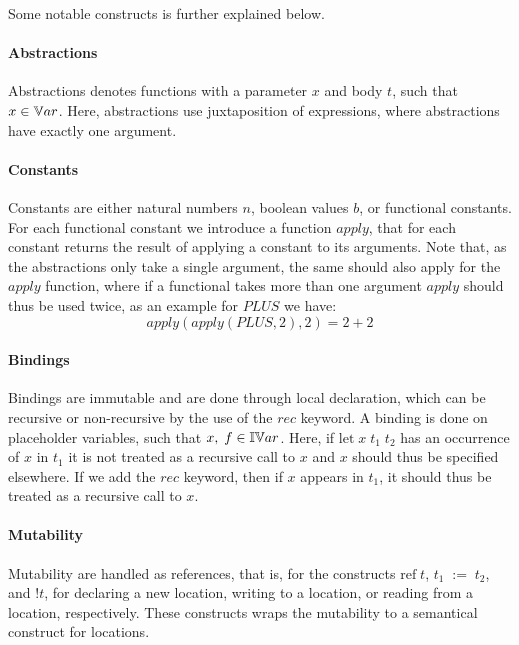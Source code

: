 \documentclass[../../master.tex]{subfiles}
\begin{document}
Some notable constructs is further explained below.

\paragraph{Abstractions}
Abstractions denotes functions with a parameter $x$ and body $t$, such that $x\in\mathbb{V}ar$.
Here, abstractions use juxtaposition of expressions, where abstractions have exactly one argument.

\paragraph{Constants}
Constants are either natural numbers $n$, boolean values $b$, or functional constants.
For each functional constant we introduce a function $apply$, that for each constant returns the result of applying a constant to its arguments.
Note that, as the abstractions only take a single argument, the same should also apply for the $apply$ function, where if a functional takes more than one argument $apply$ should thus be used twice, as an example for $PLUS$ we have:
$$apply(apply(PLUS,2),2)=2+2$$

\paragraph{Bindings}
Bindings are immutable and are done through local declaration, which can be recursive or non-recursive by the use of the $rec$ keyword.
A binding is done on placeholder variables, such that $x,\;f\in\mathbb{IV}ar$.
Here, if $\mbox{let}\;x\;t_1\;t_2$ has an occurrence of $x$ in $t_1$ it is not treated as a recursive call to $x$ and $x$ should thus be specified elsewhere.
If we add the $rec$ keyword, then if $x$ appears in $t_1$, it should thus be treated as a recursive call to $x$.

\paragraph{Mutability}
Mutability are handled as references, that is, for the constructs $\mbox{ref}\;t$, $t_1\;:=\;t_2$, and $!t$, for declaring a new location, writing to a location, or reading from a location, respectively.
These constructs wraps the mutability to a semantical construct for locations.
\end{document}
